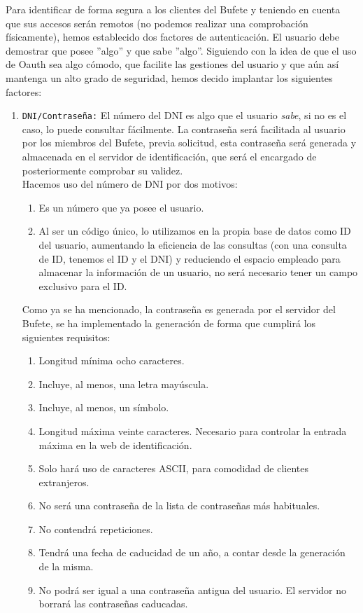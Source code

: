 \documentclass[a4,12pt,onecolum]{article}
\begin{document}
Para identificar de forma segura a los clientes del Bufete y teniendo en cuenta que sus accesos serán remotos (no podemos realizar una comprobación físicamente), hemos establecido dos factores de autenticación. El usuario debe demostrar que posee ''algo'' y que sabe ''algo''. Siguiendo con la idea de que el uso de Oauth sea algo cómodo, que facilite las gestiones del usuario y que aún así mantenga un alto grado de seguridad, hemos decido implantar los siguientes factores:

\begin{enumerate}
	\item \texttt{DNI/Contraseña:} El número del DNI es algo que el usuario \emph{sabe}, si no es el caso, lo 		puede consultar fácilmente. La contraseña será facilitada al usuario por los miembros del Bufete, previa 		solicitud, esta contraseña será generada y almacenada en el servidor de identificación, que será el 			encargado de posteriormente comprobar su validez. \\
	Hacemos uso del número de DNI por dos motivos:
	\begin{enumerate}
		\item Es un número que ya posee el usuario.
		\item Al ser un código único, lo utilizamos en la propia base de datos como ID del usuario, aumentando 			la eficiencia de las consultas (con una consulta de ID, tenemos el ID y el DNI) y reduciendo el espacio 		empleado para almacenar la información de un usuario, no será necesario tener un campo exclusivo para 			el ID. \\
	\end{enumerate}
	
	Como ya se ha mencionado, la contraseña es generada por el servidor del Bufete, se ha implementado la 			generación de forma que cumplirá los siguientes requisitos:
	\begin{enumerate}
		\item Longitud mínima ocho caracteres.
		\item Incluye, al menos, una letra mayúscula.
		\item Incluye, al menos, un símbolo.
		\item Longitud máxima veinte caracteres. Necesario para controlar la entrada máxima en la web de 				identificación.
		\item Solo hará uso de caracteres ASCII, para comodidad de clientes extranjeros.
		\item No será una contraseña de la lista de contraseñas más habituales.
		\item No contendrá repeticiones.
		\item Tendrá una fecha de caducidad de un año, a contar desde la generación de la misma.
		\item No podrá ser igual a una contraseña antigua del usuario. El servidor no borrará las contraseñas 			caducadas.
	\end{enumerate}
	

\end{enumerate}
\end{document}
